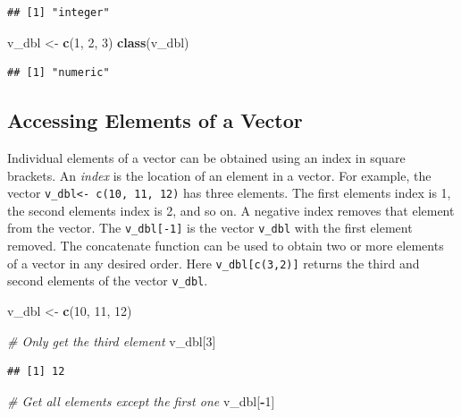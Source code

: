 \documentclass[
]{book}
\newenvironment{Shaded}{\begin{snugshade}}{\end{snugshade}}
\newcommand{\CommentTok}[1]{\textcolor[rgb]{0.56,0.35,0.01}{\textit{#1}}}
\newcommand{\DecValTok}[1]{\textcolor[rgb]{0.00,0.00,0.81}{#1}}
\newcommand{\KeywordTok}[1]{\textcolor[rgb]{0.13,0.29,0.53}{\textbf{#1}}}
\newcommand{\NormalTok}[1]{#1}
\newcommand{\OperatorTok}[1]{\textcolor[rgb]{0.81,0.36,0.00}{\textbf{#1}}}
\newcommand{\StringTok}[1]{\textcolor[rgb]{0.31,0.60,0.02}{#1}}
\begin{document}
\begin{verbatim}
## [1] "integer"
\end{verbatim}

\begin{Shaded}
\begin{Highlighting}[]
\NormalTok{v_dbl <-}\StringTok{ }\KeywordTok{c}\NormalTok{(}\DecValTok{1}\NormalTok{, }\DecValTok{2}\NormalTok{, }\DecValTok{3}\NormalTok{)}
\KeywordTok{class}\NormalTok{(v_dbl)}
\end{Highlighting}
\end{Shaded}

\begin{verbatim}
## [1] "numeric"
\end{verbatim}

\hypertarget{index}{%
\subsection{Accessing Elements of a Vector}\label{index}}

Individual elements of a vector can be obtained using an index in square brackets. An \emph{index} is the location of an element in a vector. For example, the vector \texttt{v\_dbl\textless{}-\ c(10,\ 11,\ 12)} has three elements. The first elements index is 1, the second elements index is 2, and so on. A negative index removes that element from the vector. The \texttt{v\_dbl{[}-1{]}} is the vector \texttt{v\_dbl} with the first element removed. The concatenate function can be used to obtain two or more elements of a vector in any desired order. Here \texttt{v\_dbl{[}c(3,2){]}} returns the third and second elements of the vector \texttt{v\_dbl}.

\begin{Shaded}
\begin{Highlighting}[]
\NormalTok{v_dbl <-}\StringTok{ }\KeywordTok{c}\NormalTok{(}\DecValTok{10}\NormalTok{, }\DecValTok{11}\NormalTok{, }\DecValTok{12}\NormalTok{)}

\CommentTok{# Only get the third element}
\NormalTok{v_dbl[}\DecValTok{3}\NormalTok{]}
\end{Highlighting}
\end{Shaded}

\begin{verbatim}
## [1] 12
\end{verbatim}

\begin{Shaded}
\begin{Highlighting}[]
\CommentTok{# Get all elements except the first one}
\NormalTok{v_dbl[}\OperatorTok{-}\DecValTok{1}\NormalTok{]}
\end{Highlighting}
\end{Shaded}
\end{document}
